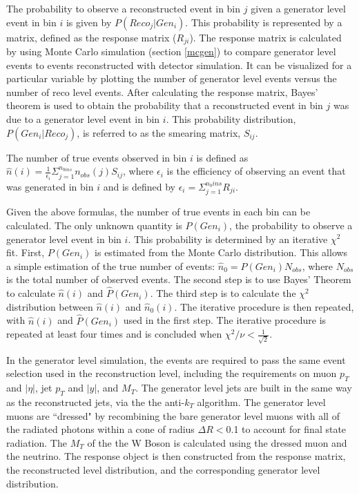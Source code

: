\documentclass[oneside, letterpaper, oldfontcommands]{memoir}
\begin{document}
\qquad The probability to observe a reconstructed event in bin $j$ given a generator level event in bin $i$ is given by $P(Reco_{j}|Gen_{i})$. This probability is represented by a matrix, defined as the response matrix ($R_{ji}$). The response matrix is calculated by using Monte Carlo simulation (section \ref{mcgen}) to compare generator level events to events reconstructed with detector simulation. It can be visualized for a particular variable by plotting the number of generator level events versus the number of reco level events. After calculating the response matrix, Bayes' theorem is used to obtain the probability that a reconstructed event in bin $j$ was due to a generator level event in bin $i$. This probability distribution, $P(Gen_{i}|Reco_{j})$, is referred to as the smearing matrix, $S_{ij}$.

\qquad The number of true events observed in bin $i$ is defined as $\hat{n}(i) = \frac{1}{\epsilon_{i}}\Sigma_{j=1}^{n_{bins}}n_{obs}(j)S_{ij}$, where $\epsilon_{i}$ is the efficiency of observing an event that was generated in bin $i$ and is defined by $\epsilon_{i}=\Sigma_{j=1}^{n_bins}R_{ji}$.

\qquad Given the above formulas, the number of true events in each bin can be calculated. The only unknown quantity is $P(Gen_{i})$, the probability to observe a generator level event in bin $i$. This probability is determined by an iterative $\chi^2$ fit. First, $P(Gen_{i})$ is estimated from the Monte Carlo distribution. This allows a simple estimation of the true number of events: $\hat{n}_{0} = P(Gen_{i})N_{obs}$, where $N_{obs}$ is the total number of observed events. The second step is to use Bayes' Theorem to calculate $\hat{n}(i)$ and $\hat{P}(Gen_{i})$. The third step is to calculate the $\chi^{2}$ distribution between $\hat{n}(i)$ and $\hat{n}_{0}(i)$. The iterative procedure is then repeated, with $\hat{n}(i)$ and $\hat{P}(Gen_{i})$ used in the first step. The iterative procedure is repeated at least four times and is concluded when $\chi^{2}/\nu < \frac{1}{\sqrt{2}}$.

\qquad In the generator level simulation, the events are required to pass the same event selection used in the reconstruction level, including the requirements on muon $p_{T}$ and $|\eta|$, jet $p_{T}$ and $|y|$, and $M_{T}$. The generator level jets are built in the same way as the reconstructed jets, via the the anti-$k_{T}$ algorithm. The generator level muons are ``dressed" by recombining the bare generator level muons with all of the radiated photons within a cone of radius $\Delta R <$0.1 to account for final state radiation. The $M_{T}$ of the the W Boson is calculated using the dressed muon and the neutrino. The response object is then constructed from the response matrix, the reconstructed level distribution, and the corresponding generator level distribution. 
\end{document}
